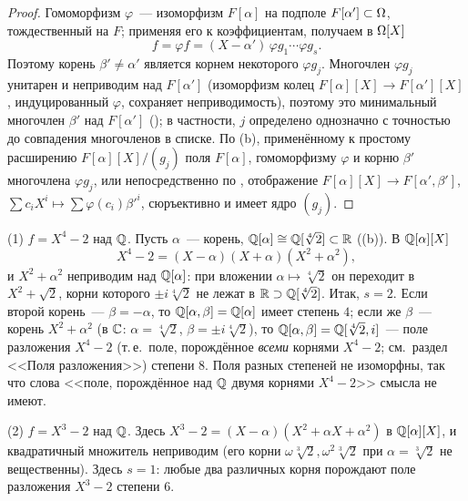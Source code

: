 \begin{proof}
Гомоморфизм $\varphi$~--- изоморфизм $F[\alpha]$ на подполе $F[\alpha']\subset\Omega$, тождественный на $F$; применяя его к
коэффициентам, получаем в $\Omega[X]$
\[
f=\varphi f=(X-\alpha')\,\varphi g_1\cdots\varphi g_s .
\]
Поэтому корень $\beta'\ne\alpha'$ является корнем некоторого $\varphi g_j$. Многочлен $\varphi g_j$ унитарен и неприводим над
$F[\alpha']$ (изоморфизм колец $F[\alpha][X]\to F[\alpha'][X]$, индуцированный $\varphi$, сохраняет неприводимость), поэтому это
минимальный многочлен $\beta'$ над $F[\alpha']$ (); в частности, $j$ определено однозначно с точностью до
совпадения многочленов в списке. По (b), применённому к простому расширению $F[\alpha][X]/(g_j)$ поля $F[\alpha]$,
гомоморфизму $\varphi$ и корню $\beta'$ многочлена $\varphi g_j$, или непосредственно по , отображение $F[\alpha][X]\to F[\alpha',\beta']$, $\sum c_iX^i\mapsto\sum\varphi(c_i)\beta'^i$,
сюръективно и имеет ядро $(g_j)$.
\end{proof}

\begin{example}[2.4c]
(1) $f=X^4-2$ над $\mathbb Q$. Пусть $\alpha$~--- корень, $\mathbb Q[\alpha]\cong\mathbb Q[\sqrt[4]2]\subset\mathbb R$ ((b)). В $\mathbb Q[\alpha][X]$
\[
X^4-2=(X-\alpha)(X+\alpha)(X^2+\alpha^2),
\]
и $X^2+\alpha^2$ неприводим над $\mathbb Q[\alpha]$: при вложении $\alpha\mapsto\sqrt[4]2$ он переходит в $X^2+\sqrt2$, корни
которого $\pm i\sqrt[4]2$ не лежат в $\mathbb R\supset\mathbb Q[\sqrt[4]2]$. Итак, $s=2$. Если второй корень~--- $\beta=-\alpha$, то
$\mathbb Q[\alpha,\beta]=\mathbb Q[\alpha]$ имеет степень $4$; если же $\beta$~--- корень $X^2+\alpha^2$ (в $\mathbb C$: $\alpha=\sqrt[4]2$,
$\beta=\pm i\sqrt[4]2$), то $\mathbb Q[\alpha,\beta]=\mathbb Q[\sqrt[4]2,i]$~--- поле разложения $X^4-2$ (т.\,е.\ поле, порождённое
\emph{всеми} корнями $X^4-2$; см.\ раздел <<Поля разложения>>) степени $8$. Поля разных степеней
не изоморфны, так что слова <<поле, порождённое над $\mathbb Q$ двумя корнями $X^4-2$>> смысла не имеют.

(2) $f=X^3-2$ над $\mathbb Q$. Здесь $X^3-2=(X-\alpha)(X^2+\alpha X+\alpha^2)$ в $\mathbb Q[\alpha][X]$, и квадратичный множитель
неприводим (его корни $\omega\sqrt[3]2,\omega^2\sqrt[3]2$ при $\alpha=\sqrt[3]2$ не вещественны). Здесь $s=1$: любые два
различных корня порождают поле разложения $X^3-2$ степени $6$.
\end{example}

